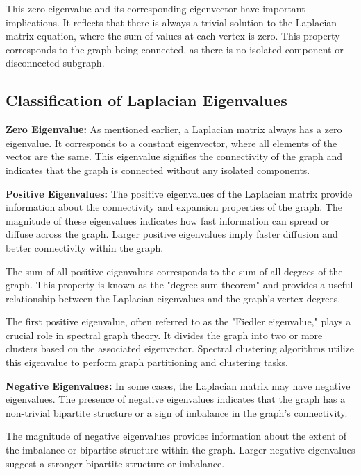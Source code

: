 \documentclass{article}
\begin{document}
    This zero eigenvalue and its corresponding eigenvector have important implications. It reflects that there is always a trivial solution to the Laplacian matrix equation, where the sum of values at each vertex is zero. This property corresponds to the graph being connected, as there is no isolated component or disconnected subgraph.

\subsection{Classification of Laplacian Eigenvalues}

    \textbf{Zero Eigenvalue:} As mentioned earlier, a Laplacian matrix always has a zero eigenvalue. It corresponds to a constant eigenvector, where all elements of the vector are the same. This eigenvalue signifies the connectivity of the graph and indicates that the graph is connected without any isolated components.
    
    \noindent \textbf{Positive Eigenvalues:} The positive eigenvalues of the Laplacian matrix provide information about the connectivity and expansion properties of the graph. The magnitude of these eigenvalues indicates how fast information can spread or diffuse across the graph. Larger positive eigenvalues imply faster diffusion and better connectivity within the graph.
    
    The sum of all positive eigenvalues corresponds to the sum of all degrees of the graph. This property is known as the "degree-sum theorem" and provides a useful relationship between the Laplacian eigenvalues and the graph's vertex degrees.
    
    The first positive eigenvalue, often referred to as the "Fiedler eigenvalue," plays a crucial role in spectral graph theory. It divides the graph into two or more clusters based on the associated eigenvector. Spectral clustering algorithms utilize this eigenvalue to perform graph partitioning and clustering tasks.
    
    \noindent \textbf{Negative Eigenvalues:} In some cases, the Laplacian matrix may have negative eigenvalues. The presence of negative eigenvalues indicates that the graph has a non-trivial bipartite structure or a sign of imbalance in the graph's connectivity.
    
    The magnitude of negative eigenvalues provides information about the extent of the imbalance or bipartite structure within the graph. Larger negative eigenvalues suggest a stronger bipartite structure or imbalance.
    
\end{document}
